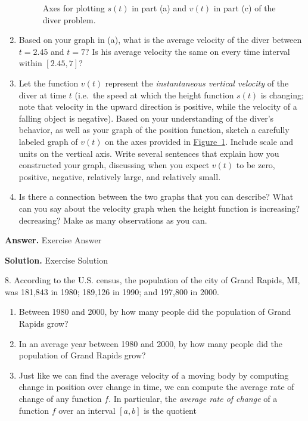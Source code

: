 \documentclass[10pt,]{book}
\theoremstyle{plain}
\theoremstyle{definition}
\theoremstyle{definition}
\theoremstyle{definition}
\theoremstyle{definition}
\theoremstyle{definition}
\numberwithin{equation}{section}
\begin{document}
\begin{exerciselist}
\begin{enumerate}[label=\alph*]
{\begin{figure}
\caption{Axes for plotting \(s(t)\) in part (a) and \(v(t)\) in part (c) of the diver problem.\label{F-1-1-Ez2}}
\end{figure}
}%
\item\hypertarget{li-30}{}Based on your graph in (a), what is the average velocity of the diver between \(t = 2.45\) and \(t=7\)?  Is his average velocity the same on every time interval within \([2.45,7]\)?%
\item\hypertarget{li-31}{}Let the function \(v(t)\) represent the \emph{instantaneous vertical velocity} of the diver at time \(t\) (i.e.~the speed at which the height function \(s(t)\) is changing; note that velocity in the upward direction is positive, while the velocity of a falling object is negative).  Based on your understanding of the diver's behavior, as well as your graph of the position function, sketch a carefully labeled graph of \(v(t)\) on the axes provided  in \hyperref[F-1-1-Ez2]{Figure~\ref{F-1-1-Ez2}}.  Include scale and units on the vertical axis.  Write several sentences that explain how you constructed your graph, discussing when you expect \(v(t)\) to be zero, positive, negative, relatively large, and relatively small.%
\item\hypertarget{li-32}{}Is there a connection between the two graphs that you can describe?  What can you say about the velocity graph when the height function is increasing?  decreasing?  Make as many observations as you can.%
\end{enumerate}
\par\smallskip
\par\smallskip
\noindent\textbf{Answer.}\hypertarget{answer-5}{}\quad
Exercise Answer%
\par\smallskip
\noindent\textbf{Solution.}\hypertarget{solution-6}{}\quad
Exercise Solution%
\item[8.]\hypertarget{exercise-8}{} According to the U.S. census, the population of the city of Grand Rapids, MI, was 181,843 in 1980; 189,126 in 1990; and 197,800 in 2000.
\leavevmode%
\begin{enumerate}[label=\alph*]
\item\hypertarget{li-33}{}Between 1980 and 2000, by how many people did the population of Grand Rapids grow?%
\item\hypertarget{li-34}{}In an average year between 1980 and 2000, by how many people did the population of Grand Rapids grow?%
\item\hypertarget{li-35}{}Just like we can find the average velocity of a moving body by computing change in position over change in time, we can compute the average rate of change of any function \(f\).  In particular, the \emph{average rate of change} of a function \(f\) over an interval \([a,b]\) is the quotient

\end{enumerate}
\end{exerciselist}
\end{document}
